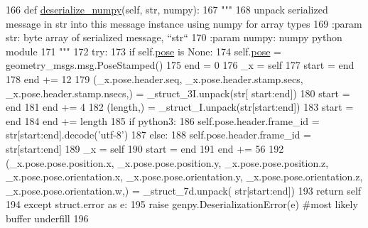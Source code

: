 \begin{DoxyCode}
166   \textcolor{keyword}{def }\hyperlink{classjaco__msgs_1_1msg_1_1__ArmPoseResult_1_1ArmPoseResult_a43b337fcc8432842fc41c375313c8ae4}{deserialize\_numpy}(self, str, numpy):
167     \textcolor{stringliteral}{"""}
168 \textcolor{stringliteral}{    unpack serialized message in str into this message instance using numpy for array types}
169 \textcolor{stringliteral}{    :param str: byte array of serialized message, ``str``}
170 \textcolor{stringliteral}{    :param numpy: numpy python module}
171 \textcolor{stringliteral}{    """}
172     \textcolor{keywordflow}{try}:
173       \textcolor{keywordflow}{if} self.\hyperlink{classjaco__msgs_1_1msg_1_1__ArmPoseResult_1_1ArmPoseResult_a1ecfceb51d3dc9aa38ea12a77158af38}{pose} \textcolor{keywordflow}{is} \textcolor{keywordtype}{None}:
174         self.\hyperlink{classjaco__msgs_1_1msg_1_1__ArmPoseResult_1_1ArmPoseResult_a1ecfceb51d3dc9aa38ea12a77158af38}{pose} = geometry\_msgs.msg.PoseStamped()
175       end = 0
176       \_x = self
177       start = end
178       end += 12
179       (\_x.pose.header.seq, \_x.pose.header.stamp.secs, \_x.pose.header.stamp.nsecs,) = \_struct\_3I.unpack(str[
      start:end])
180       start = end
181       end += 4
182       (length,) = \_struct\_I.unpack(str[start:end])
183       start = end
184       end += length
185       \textcolor{keywordflow}{if} python3:
186         self.pose.header.frame\_id = str[start:end].decode(\textcolor{stringliteral}{'utf-8'})
187       \textcolor{keywordflow}{else}:
188         self.pose.header.frame\_id = str[start:end]
189       \_x = self
190       start = end
191       end += 56
192       (\_x.pose.pose.position.x, \_x.pose.pose.position.y, \_x.pose.pose.position.z, 
      \_x.pose.pose.orientation.x, \_x.pose.pose.orientation.y, \_x.pose.pose.orientation.z, \_x.pose.pose.orientation.w,) = \_struct\_7d.unpack(
      str[start:end])
193       \textcolor{keywordflow}{return} self
194     \textcolor{keywordflow}{except} struct.error \textcolor{keyword}{as} e:
195       \textcolor{keywordflow}{raise} genpy.DeserializationError(e) \textcolor{comment}{#most likely buffer underfill}
196 
\end{DoxyCode}
